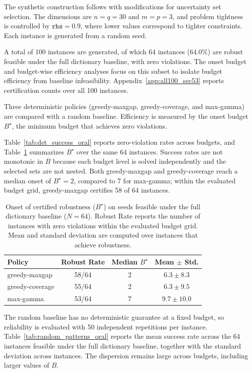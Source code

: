 \documentclass[accepted]{uai2026}
\theoremstyle{plain}
\theoremstyle{definition}
\theoremstyle{remark}
\begin{document}
The synthetic construction follows \citet{LozanoBorrero2025} with modifications for uncertainty set selection. The dimensions are $n=q=30$ and $m=p=3$, and problem tightness is controlled by $\texttt{rhs}=0.9$, where lower values correspond to tighter constraints. Each instance is generated from a random seed.

A total of 100 instances are generated, of which 64 instances (64.0\%) are robust feasible under the full dictionary baseline, with zero violations. The onset budget and budget-wise efficiency analyses focus on this subset to isolate budget efficiency from baseline infeasibility. Appendix~\ref{app:all100_sec53} reports certification counts over all 100 instances.

Three deterministic policies (greedy-maxgap, greedy-coverage, and max-gamma) are compared with a random baseline. Efficiency is measured by the onset budget $B^\star$, the minimum budget that achieves zero violations.

Table~\ref{tab:det_success_oral} reports zero-violation rates across budgets, and Table~\ref{tab:Bstar_oral} summarizes $B^\star$ over the same 64 instances. Success rates are not monotonic in $B$ because each budget level is solved independently and the selected sets are not nested. Both greedy-maxgap and greedy-coverage reach a median onset of $B^\star=2$, compared to 7 for max-gamma; within the evaluated budget grid, greedy-maxgap certifies 58 of 64 instances.

\begin{table}[!h]
\centering\small
\setlength{\tabcolsep}{4pt}
\caption{Onset of certified robustness ($B^\star$) on seeds feasible under the full dictionary baseline ($N=64$). Robust Rate reports the number of instances with zero violations within the evaluated budget grid. Mean and standard deviation are computed over instances that achieve robustness.}
\label{tab:Bstar_oral}
\begin{tabular}{lccc}
\toprule
Policy & Robust Rate & Median $B^\star$ & Mean $\pm$ Std. \\
\midrule
greedy-maxgap   & 58/64 & 2 & $6.3 \pm 8.3$ \\
greedy-coverage & 55/64 & 2 & $6.3 \pm 9.5$ \\
max-gamma       & 53/64 & 7 & $9.7 \pm 10.0$ \\
\bottomrule
\end{tabular}
\end{table}

The random baseline has no deterministic guarantee at a fixed budget, so reliability is evaluated with 50 independent repetitions per instance. Table~\ref{tab:random_patterns_oral} reports the mean success rate across the 64 instances feasible under the full dictionary baseline, together with the standard deviation across instances. The dispersion remains large across budgets, including larger values of $B$.
\end{document}
